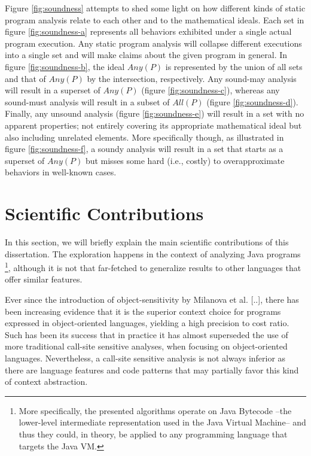 Figure \ref{fig:soundness} attempts to shed some light on how different kinds of static program analysis relate to each other and to the mathematical ideals. Each set in figure \ref{fig:soundness-a} represents all behaviors exhibited under a single actual program execution. Any static program analysis will collapse different executions into a single set and will make claims about the given program in general. In figure \ref{fig:soundness-b}, the ideal $Any(P)$ is represented by the union of all sets and that of $Any(P)$ by the intersection, respectively. Any sound-may analysis will result in a superset of $Any(P)$ (figure \ref{fig:soundness-c}), whereas any sound-must analysis will result in a subset of $All(P)$ (figure \ref{fig:soundness-d}). Finally, any unsound analysis (figure \ref{fig:soundness-e}) will result in a set with no apparent properties; not entirely covering its appropriate mathematical ideal but also including unrelated elements. More specifically though, as illustrated in figure \ref{fig:soundness-f}, a soundy analysis will result in a set that starts as a superset of $Any(P)$ but misses some hard (i.e., costly) to overapproximate behaviors in well-known cases.


\section{Scientific Contributions}

In this section, we will briefly explain the main scientific contributions of this dissertation. The exploration happens in the context of analyzing Java programs \footnote{More specifically, the presented algorithms operate on Java Bytecode --the lower-level intermediate representation used in the Java Virtual Machine-- and thus they could, in theory, be applied to any programming language that targets the Java VM.}, although it is not that far-fetched to generalize results to other languages that offer similar features.  

Ever since the introduction of object-sensitivity by Milanova et al. [..], there has been increasing evidence that it is the superior context choice for programs expressed in object-oriented languages, yielding a high precision to cost ratio. Such has been its success that in practice it has almost superseded the use of more traditional call-site sensitive analyses, when focusing on object-oriented languages. Nevertheless, a call-site sensitive analysis is not always inferior as there are language features and code patterns that may partially favor this kind of context abstraction.

